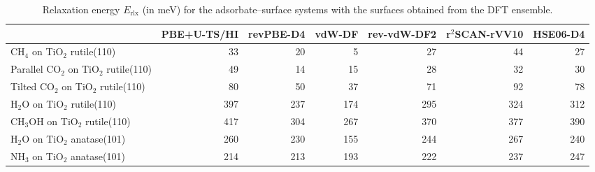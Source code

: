 \begin{table}
\caption{\label{tab:lattice_parameters_tio2}Relaxation energy $E_\textrm{rlx}$ (in meV) for the adsorbate--surface systems with the  surfaces obtained from the DFT ensemble.}
\begin{tabular}{lrrrrrr}
\toprule
 & PBE+U-TS/HI & revPBE-D4 & vdW-DF & rev-vdW-DF2 & r$^2$SCAN-rVV10 & HSE06-D4 \\ 
\midrule
CH$_4$ on TiO$_2$ rutile(110) & 33 & 20 & 5 & 27 & 44 & 27 \\
Parallel CO$_2$ on TiO$_2$ rutile(110) & 49 & 14 & 15 & 28 & 32 & 30 \\
Tilted CO$_2$ on TiO$_2$ rutile(110) & 80 & 50 & 37 & 71 & 92 & 78 \\
H$_2$O on TiO$_2$ rutile(110) & 397 & 237 & 174 & 295 & 324 & 312 \\
CH$_3$OH on TiO$_2$ rutile(110) & 417 & 304 & 267 & 370 & 377 & 390 \\
H$_2$O on TiO$_2$ anatase(101) & 260 & 230 & 155 & 244 & 267 & 240 \\
NH$_3$ on TiO$_2$ anatase(101) & 214 & 213 & 193 & 222 & 237 & 247 \\
\bottomrule
\end{tabular}
\end{table}